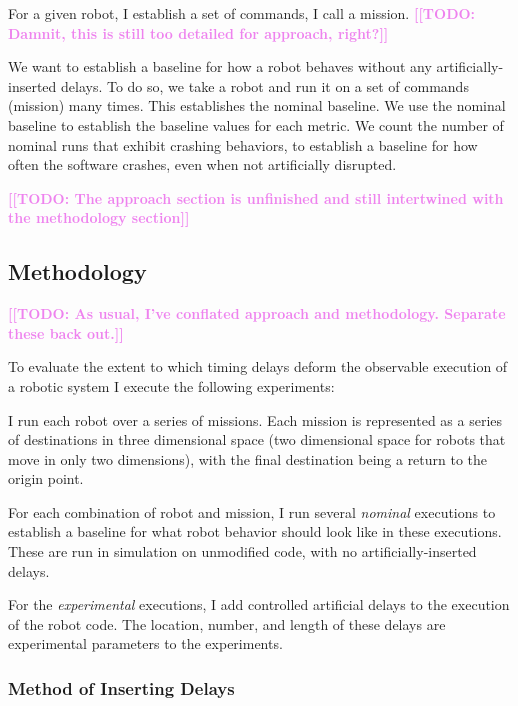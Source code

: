 \documentclass[conference]{IEEEtran}
\newcommand{\todo}[1]{\textcolor{violet}{{\bfseries [[TODO: #1]]}}}
\begin{document}
For a given robot, I establish a set of commands, I call a mission. \todo{Damnit, this is still too detailed for approach, right?}

We want to establish a baseline for how a robot behaves without any artificially-inserted delays. To do so, we take a robot and run it on a set of commands (mission) many times.
This establishes the nominal baseline.
We use the nominal baseline to establish the baseline values for each metric.
We count the number of nominal runs that exhibit crashing behaviors, to establish a baseline for how often the software crashes, even when not artificially disrupted.

\todo{The approach section is unfinished and still intertwined with the methodology section}

\subsection{Methodology}
\label{sec:timing-methodology}
\todo{As usual, I've conflated approach and methodology. Separate these back out.}

To evaluate the extent to which timing delays deform the observable execution of a robotic system I execute the following experiments:

I run each robot over a series of missions. Each mission is represented as a series of destinations in three dimensional space (two dimensional space for robots that move in only two dimensions), with the final destination being a return to the origin point.

For each combination of robot and mission, I run several \emph{nominal} executions to establish a baseline for what robot behavior should look like in these executions. These are run in simulation on unmodified code, with no artificially-inserted delays.

For the \emph{experimental} executions, I add controlled artificial delays to the execution of the robot code.
The location, number, and length of these delays are experimental parameters to the experiments.
\subsubsection{Method of Inserting Delays}
\label{sec:timing-methodology-delays}
\end{document}
